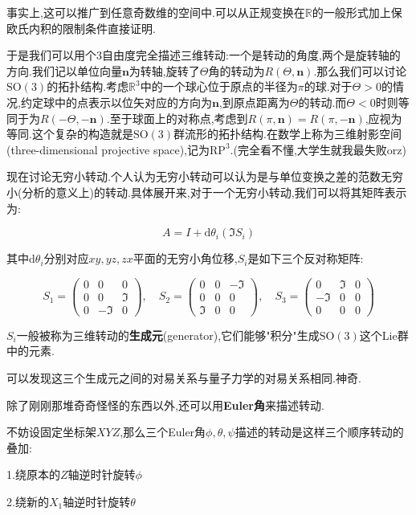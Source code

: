 \documentclass[UTF8]{article}
\newcommand{\D}{\mathrm{d}}
\begin{document}
	事实上,这可以推广到任意奇数维的空间中.可以从正规变换在$\mathbb{R}$的一般形式加上保欧氏内积的限制条件直接证明.
	
	于是我们可以用个3自由度完全描述三维转动:一个是转动的角度,两个是旋转轴的方向.我们记以单位向量$\boldsymbol{n}$为转轴,旋转了$\Theta$角的转动为$R(\Theta,\boldsymbol{n})$.那么我们可以讨论$\mathrm{SO(3)}$的拓扑结构.考虑$\mathbb{R}^3$中的一个球心位于原点的半径为$\pi$的球.对于$\Theta>0$的情况,约定球中的点表示以位矢对应的方向为$\boldsymbol{n}$,到原点距离为$\Theta$的转动.而$\Theta<0$时则等同于为$R(-\Theta,-\boldsymbol{n})$.至于球面上的对称点,考虑到$R(\pi,\boldsymbol{n})=R(\pi,-\boldsymbol{n})$,应视为等同.这个复杂的构造就是$\mathrm{SO(3)}$群流形的拓扑结构.在数学上称为三维射影空间(three-dimensional projective space),记为$\mathrm{RP^3}$.(完全看不懂,大学生就我最失败orz)
	
	现在讨论无穷小转动.个人认为无穷小转动可以认为是与单位变换之差的范数无穷小(分析的意义上)的转动.具体展开来,对于一个无穷小转动,我们可以将其矩阵表示为:
	
	\[A=I+\D\theta_i(\Im S_i)\]
	
	其中$\D\theta_i$分别对应$xy,yz,zx$平面的无穷小角位移,$S_i$是如下三个反对称矩阵:
	
	\[
	S_1=
	\begin{pmatrix}
		0&0&0\\
		0&0&\Im\\
		0&-\Im&0
	\end{pmatrix}
	,\quad S_2=
	\begin{pmatrix}
		0&0&-\Im\\
		0&0&0\\
		\Im&0&0
	\end{pmatrix}
	,\quad S_3=
	\begin{pmatrix}
		0&\Im&0\\
		-\Im&0&0\\
		0&0&0
	\end{pmatrix}
	\]
	
	$S_i$一般被称为三维转动的\textbf{生成元}(generator),它们能够"积分"生成$\mathrm{SO(3)}$这个Lie群中的元素.
	
	可以发现这三个生成元之间的对易关系与量子力学的对易关系相同.神奇.
	
	除了刚刚那堆奇奇怪怪的东西以外,还可以用\textbf{Euler角}来描述转动.
	
	不妨设固定坐标架$XYZ$,那么三个Euler角$\phi,\theta,\psi$描述的转动是这样三个顺序转动的叠加:
	
	1.绕原本的$Z$轴逆时针旋转$\phi$
	
	2.绕新的$X_1$轴逆时针旋转$\theta$
	
\end{document}

